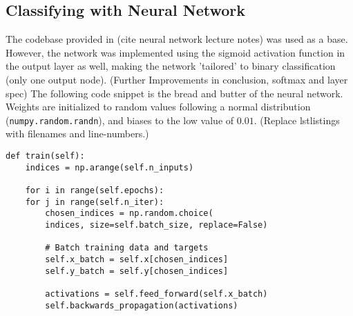 \subsection{Classifying with Neural Network}
The codebase provided in (cite neural network lecture notes) was
used as a base. However, the network was implemented using the sigmoid
activation function in the output layer as well, making the network
'tailored' to binary classification (only one output node). 
(Further Improvements in conclusion, softmax and layer spec)
The following code snippet is the bread and butter of the neural
network. Weights are initialized to random values following a
normal distribution (\lstinline{numpy.random.randn}), and biases
to the low value of $0.01$.
(Replace lstlistings with filenames and line-numbers.)
\begin{lstlisting}
def train(self):
    indices = np.arange(self.n_inputs)

    for i in range(self.epochs):
	for j in range(self.n_iter):
	    chosen_indices = np.random.choice(
		indices, size=self.batch_size, replace=False)

	    # Batch training data and targets
	    self.x_batch = self.x[chosen_indices]
	    self.y_batch = self.y[chosen_indices]

	    activations = self.feed_forward(self.x_batch)
	    self.backwards_propagation(activations)
\end{lstlisting}
